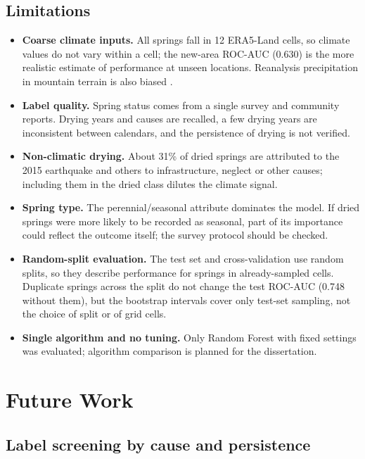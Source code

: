 \documentclass[12pt,a4paper]{article}
\begin{document}
\subsection{Limitations}\label{sec:limits}

\begin{itemize}
  \item \textbf{Coarse climate inputs.} All springs fall in 12 ERA5-Land cells, so climate values do not vary within a cell; the new-area ROC-AUC (0.630) is the more realistic estimate of performance at unseen locations. Reanalysis precipitation in mountain terrain is also biased \citep{khadka2022,lavers2022}.
  \item \textbf{Label quality.} Spring status comes from a single survey and community reports. Drying years and causes are recalled, a few drying years are inconsistent between calendars, and the persistence of drying is not verified.
  \item \textbf{Non-climatic drying.} About 31\% of dried springs are attributed to the 2015 earthquake and others to infrastructure, neglect or other causes; including them in the dried class dilutes the climate signal.
  \item \textbf{Spring type.} The perennial/seasonal attribute dominates the model. If dried springs were more likely to be recorded as seasonal, part of its importance could reflect the outcome itself; the survey protocol should be checked.
  \item \textbf{Random-split evaluation.} The test set and cross-validation use random splits, so they describe performance for springs in already-sampled cells. Duplicate springs across the split do not change the test ROC-AUC (0.748 without them), but the bootstrap intervals cover only test-set sampling, not the choice of split or of grid cells.
  \item \textbf{Single algorithm and no tuning.} Only Random Forest with fixed settings was evaluated; algorithm comparison is planned for the dissertation.
\end{itemize}

\clearpage
\section{Future Work}\label{sec:future}

\subsection{Label screening by cause and persistence}
\end{document}

